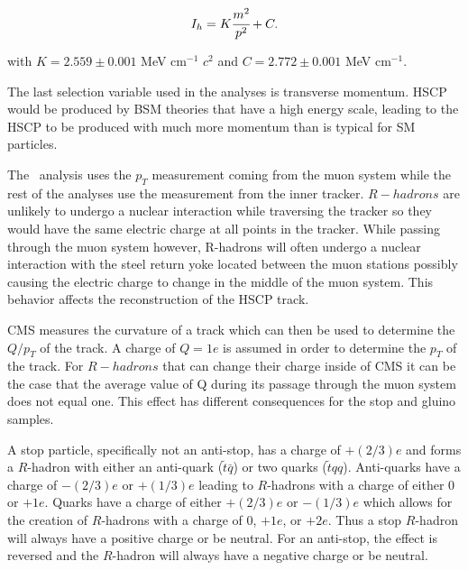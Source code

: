 \begin{equation}
I_h= K\cfrac{m^2}{p^2}+C.
\label{eq:MassFromHarmonicEstimator}
\end{equation}

with  $K=2.559 \pm 0.001$ MeV cm$^{-1}$ $c^2$ and
$C=2.772 \pm 0.001$ MeV cm$^{-1}$.

The last selection variable used in the analyses is transverse momentum.
HSCP would be produced by BSM theories that have a high energy scale, leading to the HSCP to be produced with much
more momentum than is typical for SM particles.

The \muononly\ analysis uses the $p_T$ measurement coming from the muon system while the rest of the analyses use the measurement from the inner tracker.
$R-hadrons$ are unlikely to undergo a nuclear interaction while traversing the tracker so they would have the same electric charge at all points in the tracker.
While passing through the muon system however, R-hadrons will often undergo a nuclear interaction with the steel return yoke located between the muon stations
possibly causing the electric charge to change in the middle of the muon system. This behavior affects the reconstruction of the HSCP track.

CMS measures the curvature of a track which can then be used to determine the $Q/p_T$ of the track. A charge of $Q=1e$ is assumed in order to determine the $p_T$ of the track.
For $R-hadrons$ that can change their charge inside of CMS it can be the case that the average value of Q during its passage through the muon system does not equal one.
This effect has different consequences for the stop and gluino samples. 

A stop particle, specifically not an anti-stop, has a charge of $+(2/3)e$ and forms a $R$-hadron with either an anti-quark ($\tilde{t} \bar{q}$) or
two quarks  ($\tilde{t} q q$). Anti-quarks have a charge of $-(2/3)e$ or $+(1/3)e$ leading to $R$-hadrons with a charge
of either 0 or $+1e$. Quarks have a charge of either $+(2/3)e$ or $-(1/3)e$ which allows for
the creation of $R$-hadrons with a charge of 0, $+1e$, or $+2e$. Thus a stop $R$-hadron will always have a
positive charge or be neutral. For an anti-stop, the effect is reversed and the $R$-hadron will always have a
negative charge or be neutral.


